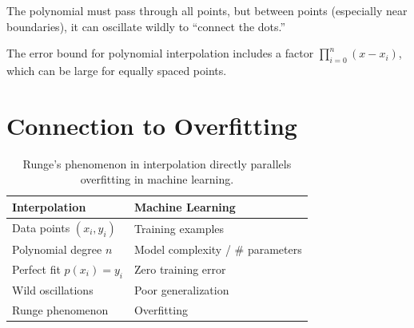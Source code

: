 
 The polynomial must pass through all points, but between points (especially near boundaries), it can oscillate wildly to ``connect the dots.''

 The error bound for polynomial interpolation includes a factor $\prod_{i=0}^n (x - x_i)$, which can be large for equally spaced points.




\newpage
\section{Connection to Overfitting}


\begin{table}[ht]
\centering
\begin{tabular}{p{}p{}}
\toprule
\textbf{Interpolation} & \textbf{Machine Learning} \\
\midrule
Data points $(x_i, y_i)$ & Training examples \\
Polynomial degree $n$ & Model complexity / \# parameters \\
Perfect fit $p(x_i) = y_i$ & Zero training error \\
Wild oscillations & Poor generalization \\
Runge phenomenon & Overfitting \\
\bottomrule
\end{tabular}
\vspace{2em}
\caption{Runge's phenomenon in interpolation directly parallels overfitting in machine learning.}
\label{tab:interpolation_ml_analogy}
\end{table}


